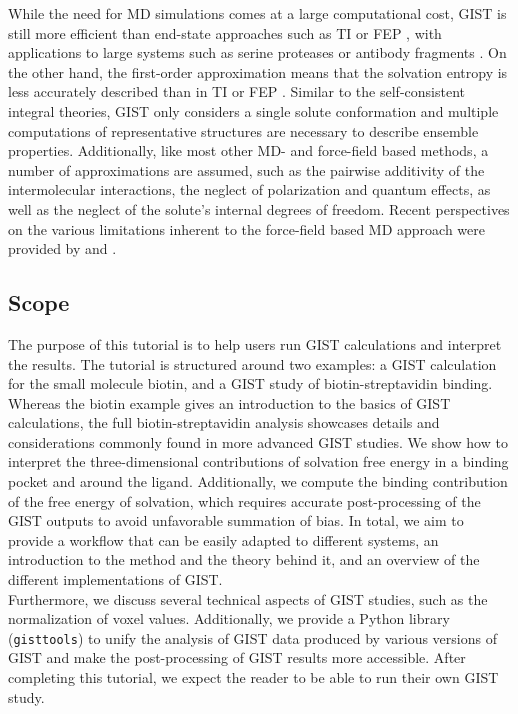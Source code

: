 \documentclass[9pt,tutorial]{livecoms}
\newcommand{\software}{\texttt}
\begin{document}
While the need for MD simulations comes at a large computational cost, GIST is still more efficient than end-state approaches such as TI \cite{Kirkwood1935-ti} or FEP \cite{Zwanzig1954-reweighting}, with applications to large systems such as serine proteases \cite{Kraml2019-gigist} or antibody fragments \cite{Waibl2021-gist-antibodies}.
On the other hand, the first-order approximation means that the solvation entropy is less accurately described than in TI or FEP \cite{Chen2021,Waibl2021-gist-salt}. 
Similar to the self-consistent integral theories, GIST only considers a single solute conformation and  multiple computations of representative structures are necessary to describe ensemble properties. 
Additionally, like most other MD- and force-field based methods, a number of approximations are assumed, such as the pairwise additivity of the intermolecular interactions, the neglect of polarization and quantum effects, as well as the neglect of the solute's internal degrees of freedom.
Recent perspectives on the various limitations inherent to the force-field based MD approach were provided by \cite{van2021effect} and \cite{van2024methods}.

\subsection{Scope}
The purpose of this tutorial is to help users run GIST calculations and interpret the results.
The tutorial is structured around two examples: a GIST calculation for the small molecule biotin, and a GIST study of biotin-streptavidin binding. 
Whereas the biotin example gives an introduction to the basics of GIST calculations, the full biotin-streptavidin analysis showcases details and considerations commonly found in more advanced GIST studies.
We show how to interpret the three-dimensional contributions of solvation free energy in a binding pocket and around the ligand.
Additionally, we compute the binding contribution of the free energy of solvation, which requires accurate post-processing of the GIST outputs to avoid unfavorable summation of bias.
In total, we aim to provide a workflow that can be easily adapted to different systems, an introduction to the method and the theory behind it, and an overview of the different implementations of GIST.\\
Furthermore, we discuss several technical aspects of GIST studies, such as the normalization of voxel values. 
Additionally, we provide a Python library (\software{gisttools}) to unify the analysis of GIST data produced by various versions of GIST and make the post-processing of GIST results more accessible.
After completing this tutorial, we expect the reader to be able to run their own GIST study. 
\end{document}
